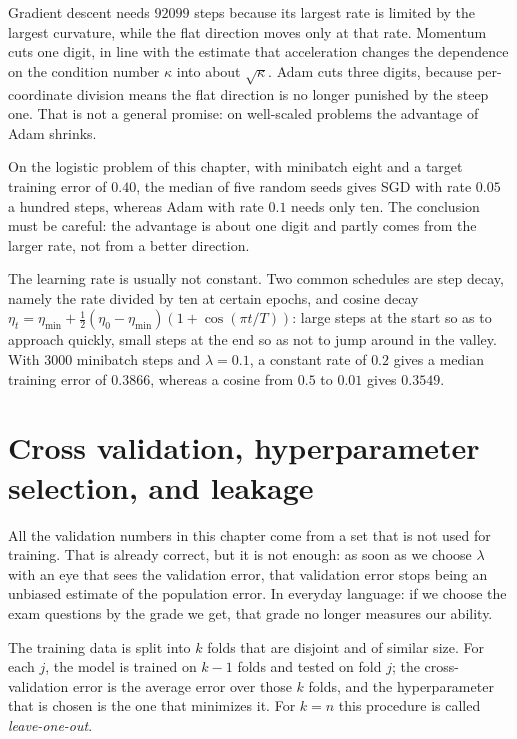 Gradient descent needs $92099$ steps because its largest rate is limited by the
largest curvature, while the flat direction moves only at that rate. Momentum cuts
one digit, in line with the estimate that acceleration changes the dependence on the
condition number $\kappa$ into about $\sqrt\kappa$. Adam cuts three digits, because
per-coordinate division means the flat direction is no longer punished by the steep
one. That is not a general promise: on well-scaled problems the advantage of Adam
shrinks.

On the logistic problem of this chapter, with minibatch eight and a target training
error of $0.40$, the median of five random seeds gives SGD with rate $0.05$ a hundred
steps, whereas Adam with rate $0.1$ needs only ten. The conclusion must be careful:
the advantage is about one digit and partly comes from the larger rate, not from a
better direction.

The learning rate is usually not constant. Two common schedules are step decay,
namely the rate divided by ten at certain epochs, and cosine decay
$\eta_t=\eta_{\min}+\frac12(\eta_0-\eta_{\min})(1+\cos(\pi t/T))$: large steps at the
start so as to approach quickly, small steps at the end so as not to jump around in
the valley. With $3000$ minibatch steps and $\lambda=0.1$, a constant rate of $0.2$
gives a median training error of $0.3866$, whereas a cosine from $0.5$ to $0.01$ gives
$0.3549$.

\section{Cross validation, hyperparameter selection, and leakage}

All the validation numbers in this chapter come from a set that is not used for
training. That is already correct, but it is not enough: as soon as we choose
$\lambda$ with an eye that sees the validation error, that validation error stops
being an unbiased estimate of the population error. In everyday language: if we
choose the exam questions by the grade we get, that grade no longer measures our
ability.


\begin{definisi}
The training data is split into $k$ folds that are disjoint and of similar size. For
each $j$, the model is trained on $k-1$ folds and tested on fold $j$; the
cross-validation error is the average error over those $k$ folds, and the
hyperparameter that is chosen is the one that minimizes it. For $k=n$ this procedure
is called \emph{leave-one-out}.
\end{definisi}

